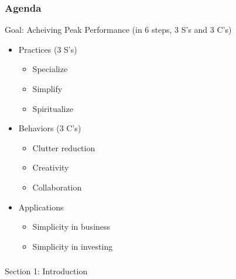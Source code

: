 \begin{frame}[fragile]\frametitle{Agenda}

Goal: Acheiving Peak Performance (in 6 steps, 3 S's and 3 C's)

\begin{itemize}
\item Practices (3 S's)
	\begin{itemize}
	\item Specialize
	\item Simplify
	\item Spiritualize
	\end{itemize}

\item Behaviors (3 C's)
	\begin{itemize}
	\item Clutter reduction
	\item Creativity
	\item Collaboration
	\end{itemize}
	
\item Applications
	\begin{itemize}
	\item Simplicity in business
	\item Simplicity in investing
	\end{itemize}	
\end{itemize}

\end{frame}

\begin{frame}[fragile]\frametitle{}
\begin{center}
{\Large Section 1: Introduction}

\end{center}
\end{frame}

